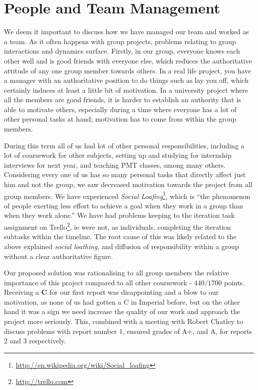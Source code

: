 \documentclass{report}
\begin{document}
		\section{People and Team Management}

		We deem it important to discuss how we have managed our team and worked as a team. As it often happens with group projects, problems relating to group interactions and dynamics surface. Firstly, in our group, everyone knows each other well and is good friends with everyone else, which reduces the authoritative attitude of any one group member towards others. In a real life project, you have a manager with an authoritative position to do things such as lay you off, which certainly induces at least a little bit of motivation. In a university project where all the members are good friends, it is harder to establish an authority that is able to motivate others, especially during a time where everyone has a lot of other personal tasks at hand; motivation has to come from within the group members.

		During this term all of us had lot of other personal responsibilities, including a lot of coursework for other subjects, setting up and studying for internship interviews for next year, and teaching PMT classes, among many others. Considering every one of us has so many personal tasks that directly affect just him and not the group, we saw decreased motivation towards the project from all group members. We have experienced \emph{Social Loafing}\footnote{\url{http://en.wikipedia.org/wiki/Social_loafing}}, which is ``the phenomenon of people exerting less effort to achieve a goal when they work in a group than when they work alone.'' We have had problems keeping to the iteration task assignment on Trello\footnote{\url{http://trello.com}}, ie were not, as individuals, completing the iteration subtasks within the timeline. The root cause of this was likely related to the above explained \emph{social loathing}, and diffusion of responsibility within a group without a clear authoritative figure.

		Our proposed solution was rationalising to all group members the relative importance of this project compared to all other coursework - $440/1700$ points. Receiving a \textbf{C} for our first report was disappointing and a blow to our motivation, as none of us had gotten a C in Imperial before, but on the other hand it was a sign we need increase the quality of our work and approach the project more seriously. This, combined with a meeting with Robert Chatley to discuss problems with report number 1, ensured grades of A+, and A, for reports 2 and 3 respectively. 
		
\end{document}
